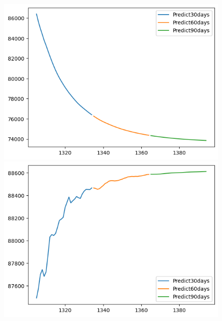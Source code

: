 \begin{figure}[H]
\begin{minipage}{0.15\textwidth}
    \includegraphics[width=1\textwidth]{resources/chapter-5/newdata1/predicted/VCB_ RNN_8-2_30days.png}
    \end{minipage}
    \hfill
        \begin{minipage}{0.15\textwidth}
    \centering
    \includegraphics[width=1\textwidth]{resources/chapter-5/newdata1/predicted/VCB_ RNN_9-1_30days.png}
    \end{minipage}
    \hfill
    \begin{minipage}{0.15\textwidth}
    \centering

\end{minipage}
\end{figure}
